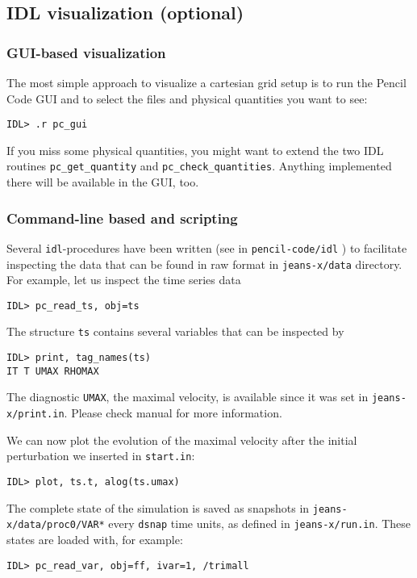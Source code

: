 \documentclass[a4paper,12pt]{article}
\begin{document}
\subsection{IDL visualization (optional)}

\subsubsection{GUI-based visualization}
The most simple approach to visualize a cartesian grid setup is to run the Pencil Code GUI and to select the files and physical quantities you want to see:
\begin{verbatim}
IDL> .r pc_gui
\end{verbatim}
If you miss some physical quantities, you might want to extend the two IDL routines \verb|pc_get_quantity| and \verb|pc_check_quantities|. Anything implemented there will be available in the GUI, too.

\subsubsection{Command-line based and scripting}
Several \verb|idl|-procedures have been written
(see in \verb|pencil-code/idl| ) to facilitate inspecting the data
that can be found in raw format in \verb|jeans-x/data| directory.
For example, let us inspect the time series data
\begin{verbatim}
IDL> pc_read_ts, obj=ts
\end{verbatim}
The structure \verb|ts| contains several variables that can be inspected by
\begin{verbatim}
IDL> print, tag_names(ts)
IT T UMAX RHOMAX
\end{verbatim}
The diagnostic \verb|UMAX|, the maximal velocity, is available since it was set
in \verb|jeans-x/print.in|. Please check manual for more information.

We can now plot the evolution of the maximal velocity after the initial perturbation we inserted in \verb|start.in|:
\begin{verbatim}
IDL> plot, ts.t, alog(ts.umax)
\end{verbatim}

The complete state of the simulation is saved as snapshots in
\verb|jeans-x/data/proc0/VAR*| every \verb|dsnap| time units,
as defined in \verb|jeans-x/run.in|.
These states are loaded with, for example:
\begin{verbatim}
IDL> pc_read_var, obj=ff, ivar=1, /trimall
\end{verbatim}
\end{document}
